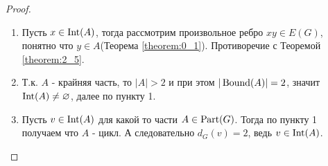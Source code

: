 \begin{proof}
	\begin{enumerate}
		\item Пусть $x \in \operatorname{Int}(A)$, тогда рассмотрим произвольное ребро  $xy \in E(G)$, понятно что  $y \in A$(Теорема \ref{theorem:0_1}).
			Противоречие с Теоремой \ref{theorem:2_5}.
		\item Т.к. $A$ - крайняя часть, то $|A| > 2$ и при этом  $|\operatorname{Bound}(A)| = 2$, значит $\operatorname{Int}(A) \neq \varnothing$, далее по пункту 1.
		\item  Пусть $v \in \operatorname{Int}(A)$ для какой то части $A \in \operatorname{Part}(G)$.
			Тогда по пункту 1 получаем что $A$ - цикл.
			А следовательно  $d_G(v) = 2$, ведь $v \in \operatorname{Int}(A)$.
	\end{enumerate}
\end{proof}


